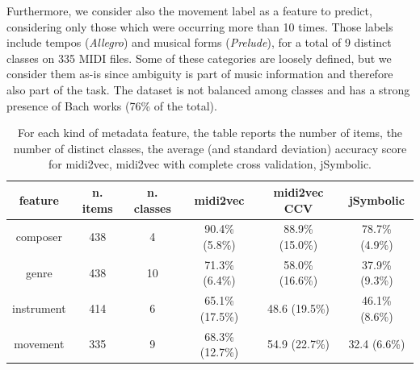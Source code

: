 \documentclass{article}
\begin{document}
Furthermore, we consider also the movement label as a feature to predict, considering only those which were occurring more than 10 times. Those labels include tempos (\textit{Allegro}) and musical forms (\textit{Prelude}), for a total of 9 distinct classes on 335 MIDI files. Some of these categories are loosely defined, but we consider them as-is since ambiguity is part of music information and therefore also part of the task. The dataset is not balanced among classes and has a strong presence of Bach works (76\% of the total).

\begin{table}[]
    \centering
    \begin{tabular}{|c|c|c|c|c|c|}
        \hline
        \textbf{feature} &  \textbf{n. items} &  \textbf{n. classes} &  \textbf{midi2vec}  & \textbf{midi2vec CCV} & \textbf{jSymbolic}\\
        \hline
        composer  &  438 & 4  &   90.4\% (5.8\%) & 88.9\% (15.0\%) &  78.7\% (4.9\%) \\
        \hline 
        genre &      438 & 10  &   71.3\%  (6.4\%) & 58.0\% (16.6\%) & 37.9\% (9.3\%)\\
        \hline
        instrument & 414 & 6  &   65.1\%  (17.5\%) & 48.6 (19.5\%) & 46.1\% (8.6\%) \\
        \hline
        movement &   335 & 9  &   68.3\% (12.7\%) & 54.9 (22.7\%) & 32.4 (6.6\%)\\
        \hline
    \end{tabular}
    
    \caption{For each kind of metadata feature, the table reports the number of items, the number of distinct classes, the average (and standard deviation) accuracy score for midi2vec, midi2vec with complete cross validation, jSymbolic.}
    \label{tab:accuracy-metadata}
\end{table}
\end{document}
